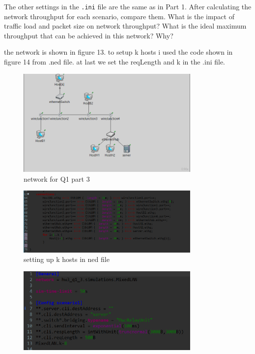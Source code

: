     The other settings in the \texttt{.ini} file are the same as in Part 1. After calculating the network throughput for each scenario, compare them. What is the impact of traffic load and packet size on network throughput? What is the ideal maximum throughput that can be achieved in this network? Why?
    
\begin{qsolve}
    \begin{qsolve}[]
        the network is shown in figure 13. to setup k hosts i used the code shown in figure 14 from .ned file. at last we set the reqLength and k in the .ini file.
        \begin{figure}[H]
            \centering
            \includegraphics[width=0.8\textwidth]{Q1_3ned.png}
            \caption{network for Q1 part 3}
        \end{figure}
        \begin{figure}[H]
            \centering
            \includegraphics[width=0.8\textwidth]{Q1_3nedfor.png}
            \caption{setting up k hosts in ned file}
        \end{figure}
        \begin{figure}[H]
            \centering
            \includegraphics[width=0.8\textwidth]{Q1_3ini.png}

\end{figure}
\end{qsolve}
\end{qsolve}
